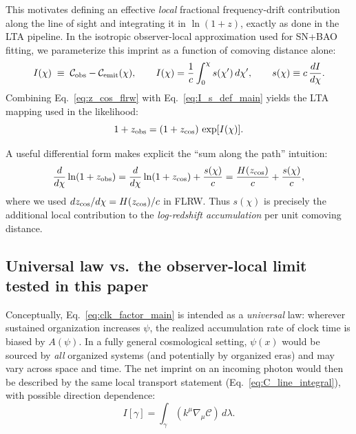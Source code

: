 \documentclass[10pt]{article}
\begin{document}
This motivates defining an effective \emph{local} fractional frequency-drift contribution along the
line of sight and integrating it in \(\ln(1+z)\), exactly as done in the LTA pipeline.
In the isotropic observer-local approximation used for SN+BAO fitting, we parameterize this imprint
as a function of comoving distance alone:
\begin{equation}
I(\chi) \;\equiv\; \mathcal{C}_{\rm obs}-\mathcal{C}_{\rm emit}(\chi),
\qquad
I(\chi)=\frac{1}{c}\int_{0}^{\chi} s(\chi')\,d\chi',
\qquad
s(\chi)\equiv c\,\frac{dI}{d\chi}.
\label{eq:I_s_def_main}
\end{equation}
Combining Eq.~\eqref{eq:z_cos_flrw} with Eq.~\eqref{eq:I_s_def_main} yields the LTA mapping used in
the likelihood:
\begin{equation}
1+z_{\rm obs} = (1+z_{\rm cos})\,\exp[I(\chi)].
\label{eq:zmap_main_rederived}
\end{equation}

A useful differential form makes explicit the “sum along the path” intuition:
\begin{equation}
\frac{d}{d\chi}\ln(1+z_{\rm obs})
=
\frac{d}{d\chi}\ln(1+z_{\rm cos}) + \frac{s(\chi)}{c}
=
\frac{H(z_{\rm cos})}{c} + \frac{s(\chi)}{c},
\label{eq:dln1pz_dchi}
\end{equation}
where we used \(dz_{\rm cos}/d\chi = H(z_{\rm cos})/c\) in FLRW.
Thus \(s(\chi)\) is precisely the additional local contribution to the \emph{log-redshift
accumulation} per unit comoving distance.

\subsection{Universal law vs.\ the observer-local limit tested in this paper}
\label{sec:photon_transport_universal_vs_local}

Conceptually, Eq.~\eqref{eq:clk_factor_main} is intended as a \emph{universal} law:
wherever sustained organization increases \(\psi\), the realized accumulation rate of clock time is
biased by \(A(\psi)\).
In a fully general cosmological setting, \(\psi(x)\) would be sourced by \emph{all} organized systems
(and potentially by organized eras) and may vary across space and time. The net imprint on an
incoming photon would then be described by the same local transport statement
(Eq.~\eqref{eq:C_line_integral}), with possible direction dependence:
\begin{equation}
I[\gamma] = \int_{\gamma} (k^\mu \nabla_\mu \mathcal{C})\,d\lambda.
\label{eq:I_general_path}
\end{equation}
\end{document}
